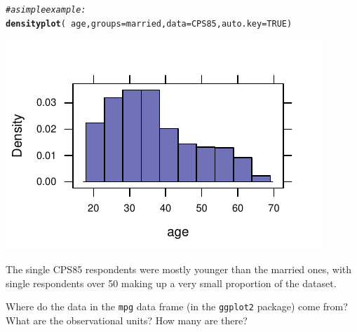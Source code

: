 \documentclass[twoside]{book}\usepackage[]{graphicx}\usepackage[]{xcolor}
\makeatletter
\def\maxwidth{ %
  \ifdim\Gin@nat@width>\linewidth
    \linewidth
  \else
    \Gin@nat@width
  \fi
}
\newcommand{\hlnum}[1]{\textcolor[rgb]{0.686,0.059,0.569}{#1}}%
\newcommand{\hlcom}[1]{\textcolor[rgb]{0.678,0.584,0.686}{\textit{#1}}}%
\newcommand{\hlopt}[1]{\textcolor[rgb]{0,0,0}{#1}}%
\newcommand{\hlstd}[1]{\textcolor[rgb]{0.345,0.345,0.345}{#1}}%
\newcommand{\hlkwc}[1]{\textcolor[rgb]{0.333,0.667,0.333}{#1}}%
\newcommand{\hlkwd}[1]{\textcolor[rgb]{0.737,0.353,0.396}{\textbf{#1}}}%
\newenvironment{kframe}{%
 \def\at@end@of@kframe{}%
 \ifinner\ifhmode%
  \def\at@end@of@kframe{\end{minipage}}%
  \begin{minipage}{\columnwidth}%
 \fi\fi%
 \def\FrameCommand##1{\hskip\@totalleftmargin \hskip-\fboxsep
 \colorbox{shadecolor}{##1}\hskip-\fboxsep
     \hskip-\linewidth \hskip-\@totalleftmargin \hskip\columnwidth}%
 \MakeFramed {\advance\hsize-\width
   \@totalleftmargin\z@ \linewidth\hsize
   \@setminipage}}%
 {\par\unskip\endMakeFramed%
 \at@end@of@kframe}
\newenvironment{knitrout}{}{} %
\newcommand{\Rindex}[1]{\index{\texttt{#1}}}
\newcommand{\dataframe}[1]{{\color{blue!80!black}\texttt{#1}}\Rindex{#1}}
\newcommand{\pkg}[1]{{\color{red!80!black}\texttt{#1}}\Rindex{#1}}
\newcounter{example}[section]
\makeatother
\begin{document}
\begin{solution}
\begin{knitrout}
\color{fgcolor}\begin{kframe}
\begin{alltt}
\hlcom{# a simple example:}
\hlkwd{densityplot}\hlstd{(}\hlopt{~}\hlstd{age,} \hlkwc{groups} \hlstd{= married,} \hlkwc{data} \hlstd{= CPS85,} \hlkwc{auto.key} \hlstd{=} \hlnum{TRUE}\hlstd{)}
\end{alltt}
\end{kframe}

{\centering \includegraphics[width=\maxwidth]{figures/fig-unnamed-chunk-21-1} 

}



\end{knitrout}
The single CPS85 respondents were mostly younger than the married ones, with single respondents over 50 making up a very small proportion of the dataset. 
\end{solution}

\begin{problem}
	Where do the data in the \dataframe{mpg} data frame (in the 
	\pkg{ggplot2} package) come from?  What are the observational 
	units?  How many are there?
\end{problem}
\end{document}
